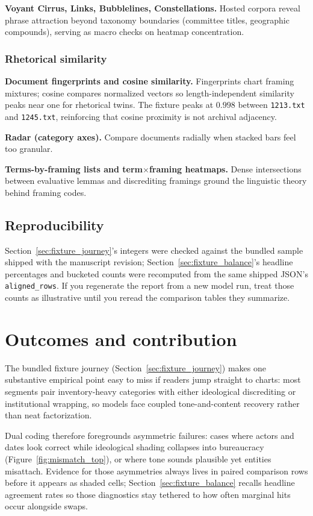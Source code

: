 \documentclass[11pt,a4paper]{article}
\theoremstyle{remark}
\begin{document}
\textbf{Voyant Cirrus, Links, Bubblelines, Constellations.} Hosted corpora reveal phrase attraction beyond taxonomy boundaries (committee titles, geographic compounds), serving as macro checks on heatmap concentration.

\subsubsection{Rhetorical similarity}
\textbf{Document fingerprints and cosine similarity.} Fingerprints chart framing mixtures; cosine compares normalized vectors so length-independent similarity peaks near one for rhetorical twins. The fixture peaks at $0.998$ between \texttt{1213.txt} and \texttt{1245.txt}, reinforcing that cosine proximity is not archival adjacency.

\textbf{Radar (category axes).} Compare documents radially when stacked bars feel too granular.

\textbf{Terms-by-framing lists and term$\times$framing heatmaps.} Dense intersections between evaluative lemmas and discrediting framings ground the linguistic theory behind framing codes.

\subsection{Reproducibility}
Section~\ref{sec:fixture_journey}'s integers were checked against the bundled sample shipped with the manuscript revision; Section~\ref{sec:fixture_balance}'s headline percentages and bucketed counts were recomputed from the same shipped JSON's \texttt{aligned\_rows}. If you regenerate the report from a new model run, treat those counts as illustrative until you reread the comparison tables they summarize.

\section{Outcomes and contribution}
\label{sec:outcomes}

The bundled fixture journey (Section~\ref{sec:fixture_journey}) makes one substantive empirical point easy to miss if readers jump straight to charts: most segments pair inventory-heavy categories with either ideological discrediting or institutional wrapping, so models face coupled tone-and-content recovery rather than neat factorization.

Dual coding therefore foregrounds asymmetric failures: cases where actors and dates look correct while ideological shading collapses into bureaucracy (Figure~\ref{fig:mismatch_top}), or where tone sounds plausible yet entities misattach. Evidence for those asymmetries always lives in paired comparison rows before it appears as shaded cells; Section~\ref{sec:fixture_balance} recalls headline agreement rates so those diagnostics stay tethered to how often marginal hits occur alongside swaps.
\end{document}
